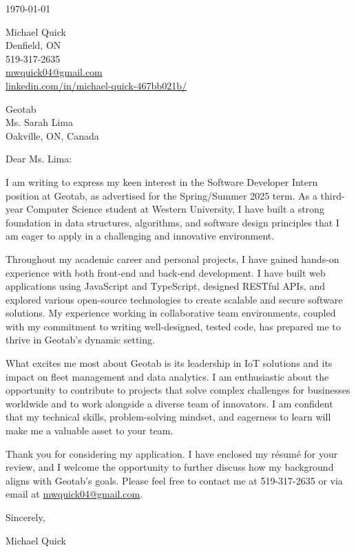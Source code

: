 \documentclass[11pt]{article}
\begin{document}
\begin{flushright}
\today
\end{flushright}

\noindent Michael Quick \\
Denfield, ON \\
519-317-2635 \\
\href{mailto:mwquick04@gmail.com}{mwquick04@gmail.com} \\
\href{https://www.linkedin.com/in/michael-quick-467bb021b/}{linkedin.com/in/michael-quick-467bb021b/}

\vspace{1em}

\noindent Geotab \\
Ms. Sarah Lima \\
Oakville, ON, Canada

\vspace{1em}

\noindent Dear Ms. Lima:

\setlength{\parindent}{15pt}
\setlength{\parskip}{0.75em}

I am writing to express my keen interest in the Software Developer Intern position at Geotab, as advertised for the Spring/Summer 2025 term. As a third-year Computer Science student at Western University, I have built a strong foundation in data structures, algorithms, and software design principles that I am eager to apply in a challenging and innovative environment.

Throughout my academic career and personal projects, I have gained hands-on experience with both front-end and back-end development. I have built web applications using JavaScript and TypeScript, designed RESTful APIs, and explored various open-source technologies to create scalable and secure software solutions. My experience working in collaborative team environments, coupled with my commitment to writing well-designed, tested code, has prepared me to thrive in Geotab's dynamic setting.

What excites me most about Geotab is its leadership in IoT solutions and its impact on fleet management and data analytics. I am enthusiastic about the opportunity to contribute to projects that solve complex challenges for businesses worldwide and to work alongside a diverse team of innovators. I am confident that my technical skills, problem-solving mindset, and eagerness to learn will make me a valuable asset to your team.

Thank you for considering my application. I have enclosed my résumé for your review, and I welcome the opportunity to further discuss how my background aligns with Geotab’s goals. Please feel free to contact me at 519-317-2635 or via email at \href{mailto:mwquick04@gmail.com}{mwquick04@gmail.com}.

\setlength{\parindent}{0pt}

\vspace{1em}
Sincerely,

\vspace{1em}
Michael Quick
\end{document}
